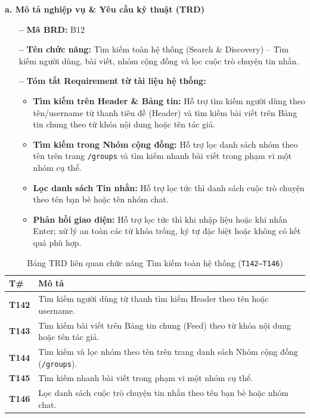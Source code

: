 \documentclass[11pt,a4paper]{article}
\begin{document}
\noindent\textbf{a. Mô tả nghiệp vụ \& Yêu cầu kỹ thuật (TRD)}
\begin{itemize}[leftmargin=1.2cm, noitemsep]
    \item[\textbf{--}] \textbf{Mã BRD:} B12
    \item[\textbf{--}] \textbf{Tên chức năng:} Tìm kiếm toàn hệ thống (Search \& Discovery) -- Tìm kiếm người dùng, bài viết, nhóm cộng đồng và lọc cuộc trò chuyện tin nhắn.
    \item[\textbf{--}] \textbf{Tóm tắt Requirement từ tài liệu hệ thống:}
    \begin{itemize}[leftmargin=0.8cm, label=$\ast$, noitemsep]
        \item \textbf{Tìm kiếm trên Header \& Bảng tin:} Hỗ trợ tìm kiếm người dùng theo tên/username từ thanh tiêu đề (Header) và tìm kiếm bài viết trên Bảng tin chung theo từ khóa nội dung hoặc tên tác giả.
        \item \textbf{Tìm kiếm trong Nhóm cộng đồng:} Hỗ trợ lọc danh sách nhóm theo tên trên trang \texttt{/groups} và tìm kiếm nhanh bài viết trong phạm vi một nhóm cụ thể.
        \item \textbf{Lọc danh sách Tin nhắn:} Hỗ trợ lọc tức thì danh sách cuộc trò chuyện theo tên bạn bè hoặc tên nhóm chat.
        \item \textbf{Phản hồi giao diện:} Hỗ trợ lọc tức thì khi nhập liệu hoặc khi nhấn Enter; xử lý an toàn các từ khóa trống, ký tự đặc biệt hoặc không có kết quả phù hợp.
    \end{itemize}
\end{itemize}

\begin{table}[H]
\centering
\small
\begin{tabularx}{\textwidth}{|C{1.5cm}|X|}
\hline
{}
\textbf{T\#} & \textbf{Mô tả} \tabularnewline
\hline
\textbf{T142} & Tìm kiếm người dùng từ thanh tìm kiếm Header theo tên hoặc username. \\ \hline
\textbf{T143} & Tìm kiếm bài viết trên Bảng tin chung (Feed) theo từ khóa nội dung hoặc tên tác giả. \\ \hline
\textbf{T144} & Tìm kiếm và lọc nhóm theo tên trên trang danh sách Nhóm cộng đồng (\texttt{/groups}). \\ \hline
\textbf{T145} & Tìm kiếm nhanh bài viết trong phạm vi một nhóm cụ thể. \\ \hline
\textbf{T146} & Lọc danh sách cuộc trò chuyện tin nhắn theo tên bạn bè hoặc nhóm chat. \\ \hline
\end{tabularx}
\caption{Bảng TRD liên quan chức năng Tìm kiếm toàn hệ thống (\texttt{T142--T146})}
\end{table}
\end{document}
